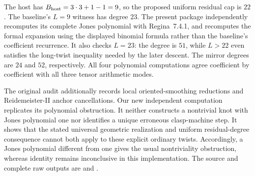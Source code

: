 The host has $B_{\rm host}=3\cdot3+1-1=9$, so the proposed uniform
residual cap is $22$. The baseline's $L=9$ witness has degree $23$.
The present package independently recomputes its complete Jones polynomial
with Regina~7.4.1, and recomputes the formal expansion using the displayed
binomial formula rather than the baseline's coefficient recurrence.
It also checks $L=23$: the degree is $51$, while $L>22$ even satisfies
the long-twist inequality needed by the later descent. The mirror degrees
are $24$ and $52$, respectively. All four polynomial computations agree
coefficient by coefficient with all three tensor arithmetic modes.

The original audit additionally records local oriented-smoothing reductions
and Reidemeister-II anchor cancellations. Our new independent computation
replicates its polynomial obstruction. It neither constructs a nontrivial
knot with Jones polynomial one nor identifies a unique erroneous
clasp-machine step. It shows that the stated universal geometric realization
and uniform residual-degree consequence cannot both apply to these explicit
ordinary twists. Accordingly, a Jones polynomial different from one gives
the usual nontriviality obstruction, whereas identity remains inconclusive
in this implementation. The source and complete raw outputs are
 and
.
